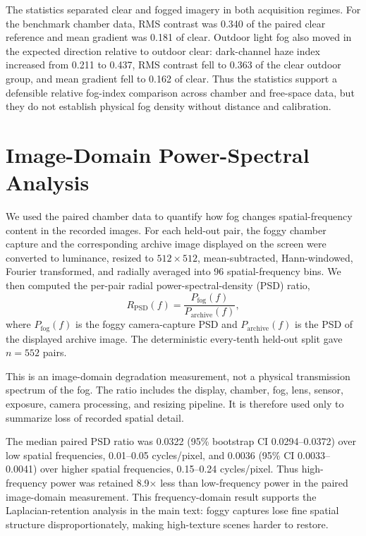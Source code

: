 \documentclass[9pt]{osa-supplemental-document}
\begin{document}
The statistics separated clear and fogged imagery in both acquisition regimes. For the benchmark chamber data, RMS contrast was 0.340 of the paired clear reference and mean gradient was 0.181 of clear. Outdoor light fog also moved in the expected direction relative to outdoor clear: dark-channel haze index increased from 0.211 to 0.437, RMS contrast fell to 0.363 of the clear outdoor group, and mean gradient fell to 0.162 of clear. Thus the statistics support a defensible relative fog-index comparison across chamber and free-space data, but they do not establish physical fog density without distance and calibration.

\section{Image-Domain Power-Spectral Analysis}
\label{secS:psd_image_domain}

We used the paired chamber data to quantify how fog changes spatial-frequency content in the recorded images. For each held-out pair, the foggy chamber capture and the corresponding archive image displayed on the screen were converted to luminance, resized to $512 \times 512$, mean-subtracted, Hann-windowed, Fourier transformed, and radially averaged into 96 spatial-frequency bins. We then computed the per-pair radial power-spectral-density (PSD) ratio,
\begin{equation}
R_{\mathrm{PSD}}(f) =
\frac{P_{\mathrm{fog}}(f)}
     {P_{\mathrm{archive}}(f)} ,
\label{eqS:psd_ratio}
\end{equation}
where $P_{\mathrm{fog}}(f)$ is the foggy camera-capture PSD and $P_{\mathrm{archive}}(f)$ is the PSD of the displayed archive image. The deterministic every-tenth held-out split gave $n=552$ pairs.

This is an image-domain degradation measurement, not a physical transmission spectrum of the fog. The ratio includes the display, chamber, fog, lens, sensor, exposure, camera processing, and resizing pipeline. It is therefore used only to summarize loss of recorded spatial detail.

The median paired PSD ratio was 0.0322 (95\% bootstrap CI 0.0294--0.0372) over low spatial frequencies, 0.01--0.05 cycles/pixel, and 0.0036 (95\% CI 0.0033--0.0041) over higher spatial frequencies, 0.15--0.24 cycles/pixel. Thus high-frequency power was retained 8.9$\times$ less than low-frequency power in the paired image-domain measurement. This frequency-domain result supports the Laplacian-retention analysis in the main text: foggy captures lose fine spatial structure disproportionately, making high-texture scenes harder to restore.
\end{document}
